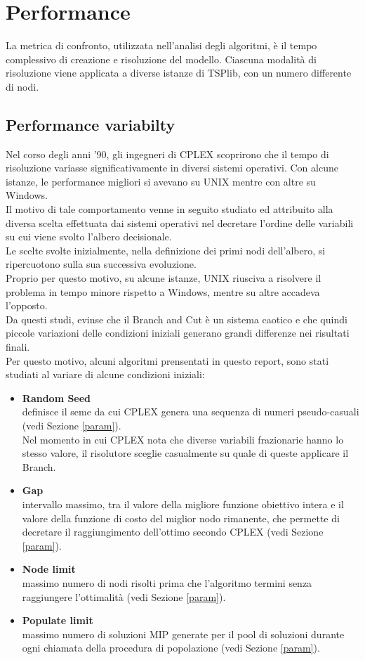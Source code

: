 \chapter{Performance}
La metrica di confronto, utilizzata nell'analisi degli algoritmi, è il tempo complessivo di creazione e risoluzione del modello. Ciascuna modalità di risoluzione viene applicata a diverse istanze di TSPlib, con un numero differente di nodi.  
\section{Performance variabilty}
Nel corso degli anni '90, gli ingegneri di CPLEX scoprirono che il tempo di risoluzione variasse significativamente in diversi sistemi operativi. Con alcune istanze, le performance migliori si avevano su UNIX mentre con altre su Windows.\\
Il motivo di tale comportamento venne in seguito studiato ed attribuito alla diversa scelta effettuata dai sistemi operativi nel decretare l'ordine delle variabili su cui viene svolto l'albero decisionale.\\
Le scelte svolte inizialmente, nella definizione dei primi nodi dell'albero, si ripercuotono sulla sua successiva evoluzione.\\
Proprio per questo motivo, su alcune istanze, UNIX riusciva a risolvere il problema in tempo minore rispetto a Windows, mentre su altre accadeva l'opposto.\\
Da questi studi, evinse che il Branch and Cut è un sistema caotico e che quindi piccole variazioni delle condizioni iniziali generano grandi differenze nei risultati finali.\\
Per questo motivo, alcuni algoritmi prensentati in questo report, sono stati studiati al variare di alcune condizioni iniziali:
\begin{itemize}
\item{\textbf{Random Seed}\\
definisce il seme da cui CPLEX genera una sequenza di numeri pseudo-casuali (vedi Sezione \ref{param}).\\
Nel momento in cui CPLEX nota che diverse variabili frazionarie hanno lo stesso valore, il risolutore sceglie casualmente su quale di queste applicare il Branch.}
\item{\textbf{Gap}\\
intervallo massimo, tra il valore della migliore funzione obiettivo intera e il valore della funzione di costo del miglior nodo rimanente, che permette di decretare il raggiungimento dell'ottimo secondo CPLEX (vedi Sezione \ref{param}).}
\item{\textbf{Node limit}\\
massimo numero di nodi risolti prima che l'algoritmo termini senza raggiungere l'ottimalità (vedi Sezione \ref{param}).}
\item{\textbf{Populate limit}\\
massimo numero di soluzioni MIP generate per il pool di soluzioni durante ogni chiamata della procedura di popolazione (vedi Sezione \ref{param}).}
\end{itemize}
